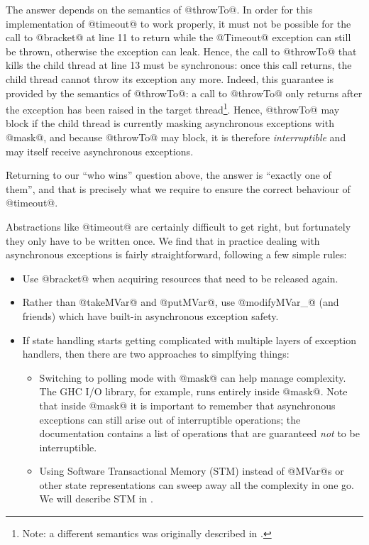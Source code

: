 The answer depends on the semantics of @throwTo@.  In order for this
implementation of @timeout@ to work properly, it must not be possible
for the call to @bracket@ at line 11 to return while the @Timeout@
exception can still be thrown, otherwise the exception can leak.
Hence, the call to @throwTo@ that kills the child thread at line 13
must be synchronous: once this call returns, the child thread cannot
throw its exception any more.  Indeed, this guarantee is provided by
the semantics of @throwTo@: a call to @throwTo@ only returns after the
exception has been raised in the target thread\footnote{Note: a
  different semantics was originally described in
  \citet{spj:asynch-exceptions}.}.  Hence, @throwTo@ may block if the
child thread is currently masking asynchronous exceptions with @mask@,
and because @throwTo@ may block, it is therefore \emph{interruptible}
and may itself receive asynchronous exceptions.

Returning to our ``who wins'' question above, the answer is ``exactly
one of them'', and that is precisely what we require to ensure the
correct behaviour of @timeout@.


Abstractions like @timeout@ are certainly difficult to get right, but
fortunately they only have to be written once.  We find that in
practice dealing with asynchronous exceptions is fairly
straightforward, following a few simple rules:

\begin{itemize}
\item Use @bracket@ when acquiring resources that need to be released
  again.
\item Rather than @takeMVar@ and @putMVar@, use @modifyMVar_@ (and
  friends) which have built-in asynchronous exception safety.
\item If state handling starts getting complicated with multiple
  layers of exception handlers, then there are two approaches to
  simplfying things:
  \begin{itemize}
    \item Switching to polling mode with @mask@ can help manage
      complexity.  The GHC I/O library, for example, runs entirely
      inside @mask@.  Note that inside @mask@ it is important to
      remember that asynchronous exceptions can still arise out of
      interruptible operations; the documentation contains a list of
      operations that are guaranteed \emph{not} to be interruptible.
    \item Using Software Transactional Memory (STM) instead of @MVar@s
      or other state representations can sweep away all the complexity
      in one go.  We will describe STM in .
  \end{itemize}
\end{itemize}


